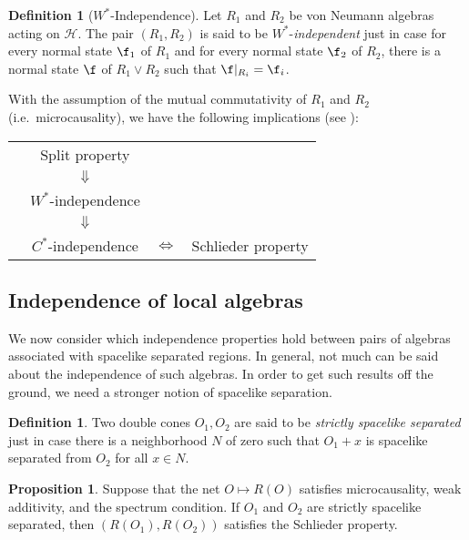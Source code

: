 \documentclass[11pt]{article}
\newenvironment{lilbox}%
  {\bigskip\noindent\begin{Sbox}\begin{minipage}{0.65\textwidth} }%
  {\end{minipage}\end{Sbox}\fbox{\TheSbox}\bigskip}%
\theoremstyle{definition}
\newtheorem{prop}[thm]{Proposition}
\theoremstyle{definition}
\newtheorem{defn}[thm]{Definition}
\theoremstyle{remark}
\def\2#1{{\mathcal #1}}
\begin{document}
\begin{defn}[$W^*$-Independence] Let $R_1$ and $R_2$ be von Neumann
  algebras acting on $\2H$.  The pair $(R_1,R_2)$ is said to be
  $W^*$-\emph{independent} just in case for every normal state $\f _1$
  of $R_1$ and for every normal state $\f _2$ of $R_2$, there is a
  normal state $\f$ of $R_1\vee R_2$ such that $\f |_{R_i}=\f _i$.
\end{defn}

With the assumption of the mutual commutativity of
$R_1$ and $R_2$ (i.e.\ microcausality), we have the
following implications (see \cite[p.\ 222]{sum}):

\begin{lilbox} \begin{tabular}{cccc}
    & Split property \\
    & $\Downarrow$    \\
    &$W^*$-independence \\
    & $\Downarrow $   \\
    & $C^*$-independence & $\Longleftrightarrow$ &
    Schlieder property
\end{tabular} \end{lilbox}



\subsection{Independence of local algebras} \label{lib2}

We now consider which independence properties hold
between pairs of algebras associated with spacelike
separated regions.  In general, not much can be said
about the independence of such algebras.  In order to
get such results off the ground, we need a stronger
notion of spacelike separation.

\begin{defn} Two double cones $O_1,O_2$ are said to be \emph{strictly
    spacelike separated} just in case there is a neighborhood $N$ of
  zero such that $O_1+x$ is spacelike separated from $O_2$ for all
  $x\in N$.  \end{defn}

\begin{prop} Suppose that the net $O\mapsto R(O)$ satisfies
  microcausality, weak additivity, and the spectrum condition.  If
  $O_1$ and $O_2$ are strictly spacelike separated, then
  $(R(O_1),R(O_2))$ satisfies the Schlieder property.
  \label{schlieder} \end{prop}
\end{document}
